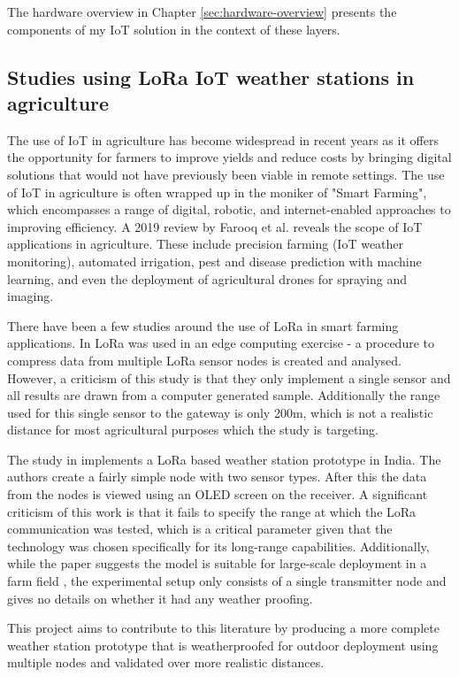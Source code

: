 The hardware overview in Chapter \ref{sec:hardware-overview} presents the
components of my IoT solution in the context of these layers.

\subsection{Studies using LoRa IoT weather stations in agriculture}

The use of IoT in agriculture has become widespread in recent years as it offers
the opportunity for farmers to improve yields and reduce costs by bringing
digital solutions that would not have previously been viable in remote settings.
The use of IoT in agriculture is often wrapped up in the moniker of "Smart
Farming", which encompasses a range of digital, robotic, and internet-enabled
approaches to improving efficiency. A 2019 review by Farooq et al.
\cite{farooq2019iot} reveals the scope of IoT applications in agriculture. These
include precision farming (IoT weather monitoring), automated irrigation, pest
and disease prediction with machine learning, and even the deployment of
agricultural drones for spraying and imaging.

There have been a few studies around the use of LoRa in smart farming
applications. In \cite{edgeAiGiaEtAl} LoRa was used in an edge computing
exercise - a procedure to compress data from multiple LoRa sensor nodes is
created and analysed. However, a criticism of this study is that they only
implement a single sensor and all results are drawn from a computer generated
sample. Additionally the range used for this single sensor to the gateway is
only 200m, which is not a realistic distance for most agricultural purposes
which the study is targeting.

The study in \cite{smartFarmKodaliEtAl} implements a LoRa based weather station
prototype in India. The authors create a fairly simple node with two sensor
types. After this the data from the nodes is viewed using an OLED screen on the
receiver. A significant criticism of this work is that it fails to specify the
range at which the LoRa communication was tested, which is a critical parameter
given that the technology was chosen specifically for its long-range
capabilities. Additionally, while the paper suggests the model is suitable for
large-scale deployment in a farm field , the experimental setup only consists of
a single transmitter node and gives no details on whether it had any weather
proofing.

This project aims to contribute to this literature by producing a more complete
weather station prototype that is weatherproofed for outdoor deployment using
multiple nodes and validated over more realistic distances.


